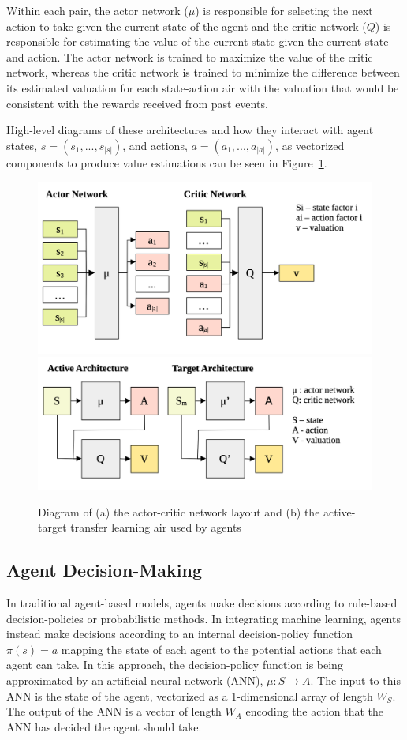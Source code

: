 Within each pair, the actor network ($\mu$) is responsible for selecting the
next action to take given the current state of the agent and the critic
network ($Q$) is responsible for estimating the value of the current state
given the current state and action.
The actor network is trained to maximize the value of the critic network,
whereas the critic network is trained to minimize the difference between its
estimated valuation for each state-action air with the valuation that
would be consistent with the rewards received from past events.

High-level diagrams of these architectures and how they interact with
agent states, $s = \left(s_1, ..., s_{|s|}\right)$, 
and actions, $a = \left(a_1, ..., a_{|a|}\right)$,
as vectorized components to produce value estimations
can be seen in Figure~\ref{fig:farm_ddqn}.

\begin{figure}
    {\includegraphics[width=.46\textwidth]{figure/ddqn1}}
    \hfill
    {\includegraphics[width=.46\textwidth]{figure/ddqn2}}
    \caption{Diagram of (a) the actor-critic network layout 
    and (b) the active-target transfer learning air used by
    agents}
    \label{fig:farm_ddqn}
\end{figure}

\subsection{Agent Decision-Making}
\label{subsec:farm_methods_decisions}

In traditional agent-based models, agents make decisions according to
rule-based decision-policies or probabilistic methods.
In integrating machine learning,
agents instead make decisions according to an internal decision-policy
function $\pi(s)=a$ mapping the state of each agent to the potential actions 
that each agent can take.
In this approach, the decision-policy function is being approximated by
an artificial neural network (ANN), $\mu:S\rightarrow A$.
The input to this ANN is the state of the agent, vectorized as a 1-dimensional
array of length $W_S$.
The output of the ANN is a vector of length $W_A$ encoding the action that
the ANN has decided the agent should take.

